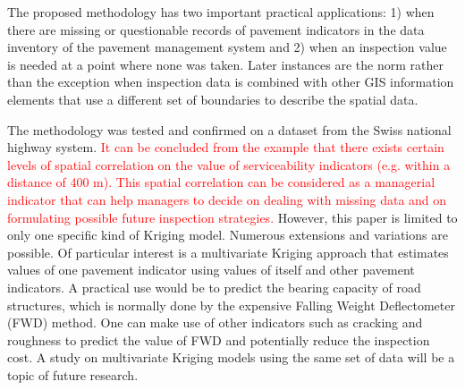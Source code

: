 \documentclass[Journal]{ascelike}
\begin{document}
The proposed methodology has two important practical applications: 1) when there are
missing or questionable records of pavement indicators in the data inventory of the pavement
management system and 2) when an inspection value is needed at a point where none was
taken. Later instances are the norm rather than the exception when inspection data is
combined with other GIS information elements that use a different set of boundaries to
describe the spatial data.

The methodology was tested and confirmed on a dataset from the Swiss national highway
system. \textcolor{red}{It can be concluded from the example that there exists certain levels of spatial correlation on the value of serviceability indicators (e.g. within a distance of 400 m). This spatial correlation can be considered as a managerial indicator that can help managers to decide on dealing with missing data and on formulating possible future inspection strategies.} However, this paper is limited to only one specific kind of Kriging model. Numerous
extensions and variations are possible. Of particular interest is a multivariate Kriging approach that estimates values 
of one pavement indicator using values of itself and other
pavement indicators. A practical use would be to predict the bearing capacity of road
structures, which is normally done by the expensive Falling Weight Deflectometer (FWD)
method. One can make use of other indicators such as cracking and roughness to predict the
value of FWD and potentially reduce the inspection cost. A study on multivariate Kriging
models using the same set of data will be a topic of future research.

%
\pagebreak
%
%
%
\appendix\label{section:references}
%
%

%
%
\appendix\label{section:R Code}

%
\end{document}
